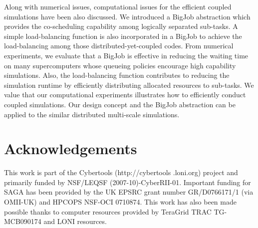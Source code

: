 \documentclass[preprint,12pt]{elsarticle}
\begin{document}
Along with numerical issues, computational issues for the efficient coupled simulations have been also discussed. We introduced a BigJob abstraction which provides the co-scheduling capability among logically separated sub-tasks. A simple load-balancing function is also incorporated in a BigJob to achieve the load-balancing among those distributed-yet-coupled codes. From numerical experiments, we evaluate that a BigJob is effective in reducing the waiting time on many supercomputers whose queueing policies encourage high capability simulations. Also, the load-balancing function contributes to reducing the simulation runtime by efficiently distributing allocated resources to sub-tasks. We value that our computational experiments illustrates how to efficiently conduct coupled simulations. Our design concept and the BigJob abstraction can be applied to the similar distributed multi-scale simulations.



\section*{Acknowledgements}
This work is part of the Cybertools (http://cybertools .loni.org)
project and primarily funded by NSF/LEQSF (2007-10)-CyberRII-01.
Important funding for SAGA has been provided by the UK EPSRC grant
number GR/D0766171/1 (via OMII-UK) and HPCOPS NSF-OCI 0710874. This
work has also been made possible thanks to computer resources provided
by TeraGrid TRAC TG-MCB090174 and LONI resources.





\end{document}
